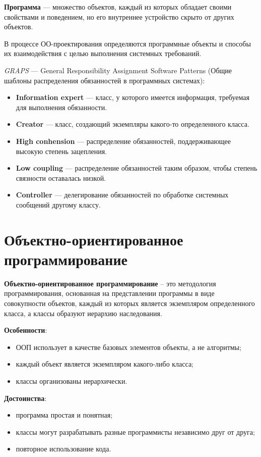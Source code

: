 \documentclass[a4paper,12pt,oneside]{extbook}
\begin{document}
\textbf{Программа} — множество объектов, каждый из которых обладает своими свойствами и поведением, но его внутреннее устройство скрыто от других объектов.

В процессе ОО-проектирования определяются программные объекты и способы их взаимодействия с целью выполнения системных требований.

\textit{GRAPS} — General Responsibility Assignment Software Patterns (Общие шаблоны распределения обязанностей в программных системах):
\begin{itemize}
    \item \textbf{Information expert} — класс, у которого имеется информация, требуемая для выполнения обязанности.
    \item \textbf{Creator} — класс, создающий экземпляры какого-то определенного класса.
    \item \textbf{High conhension} — распределение обязанностей, поддерживающее высокую степень зацепления.
    \item \textbf{Low coupling} — распределение обязанностей таким образом, чтобы степень связности оставалась низкой.
    \item \textbf{Controller} — делегирование обязанностей по обработке системных сообщений другому классу.
\end{itemize}

\section{Объектно-ориентированное программирование}%
\label{sec:Объектно-ориентированное программирование}

\textbf{Объектно-ориентированное программирование} – это методология программирования, основанная на представлении программы в виде совокупности объектов, каждый из которых является экземпляром определенного класса, а классы образуют иерархию наследования.

\textbf{Особенности}:
\begin{itemize}
    \item ООП использует в качестве базовых элементов объекты, а не алгоритмы;
    \item каждый объект является экземпляром какого-либо класса;
    \item классы организованы иерархически.
\end{itemize}

\textbf{Достоинства}:
\begin{itemize}
    \item программа простая и понятная;
    \item классы могут разрабатывать разные программисты независимо друг от друга;
    \item повторное использование кода.
\end{itemize}
\end{document}
